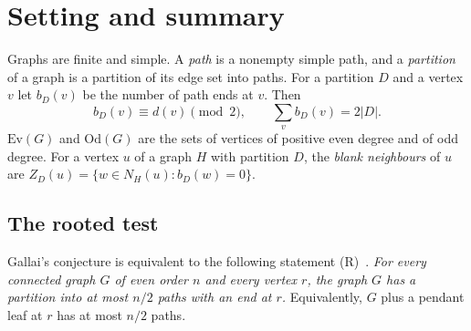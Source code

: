 \documentclass[11pt]{amsart}
\theoremstyle{definition}
\newcommand{\Ev}{\mathrm{Ev}}
\newcommand{\Od}{\mathrm{Od}}
\begin{document}
\begin{abstract}
share one new path. We test a hub-strategy conjecture: at a root with the hypotheses of the
branching base case, the root's star, a parity repair and a bounded number of further held
edges suffice. At order $8$ two further edges suffice at all $9268$ root orbits. A sample of order
$10$ needs three, and there the proved theorems apply at no root. Finally we test the inductive
template proposed for the endpoint min-max conjecture EMM, and find that EMM itself is false. Its
extension to arbitrary profiles fails at order $7$ through a linkage obstruction, and padding at a
saturated vertex lifts that failure to the Gallai budget. Gluing a below-budget failure to a gadget
through a vertex with two ends, which no path can cross, gives simple half-set counterexamples to
EMM of order $12$. Along the way, single-edge and bounded path-insertion moves turn out not to be
inductive: they fail exactly where Fan's count is tight. The hub lemmas of every degree,
the degree-four theorems, the critical instance and Fan's alternative are formalised in Lean~4.
\end{abstract}

\maketitle

\section{Setting and summary}\label{sec:intro}

Graphs are finite and simple. A \emph{path} is a nonempty simple path, and a \emph{partition} of a
graph is a partition of its edge set into paths. For a partition $D$ and a vertex $v$ let $b_D(v)$
be the number of path ends at $v$. Then
\begin{equation}\label{eq:parity}
b_D(v)\equiv d(v)\pmod 2,\qquad \sum_v b_D(v)=2|D|.
\end{equation}
$\Ev(G)$ and $\Od(G)$ are the sets of vertices of positive even degree and of odd degree. For a
vertex $u$ of a graph $H$ with partition $D$, the \emph{blank neighbours} of $u$ are
$Z_D(u)=\{w\in N_H(u):b_D(w)=0\}$.

\subsection*{The rooted test} Gallai's conjecture is equivalent to the following statement
(R)~\cite{ES}. \emph{For every connected graph $G$ of even order $n$ and every vertex $r$, the
graph $G$ has a partition into at most $n/2$ paths with an end at $r$.} Equivalently, $G$ plus a
pendant leaf at $r$ has at most $n/2$ paths.
\end{document}
